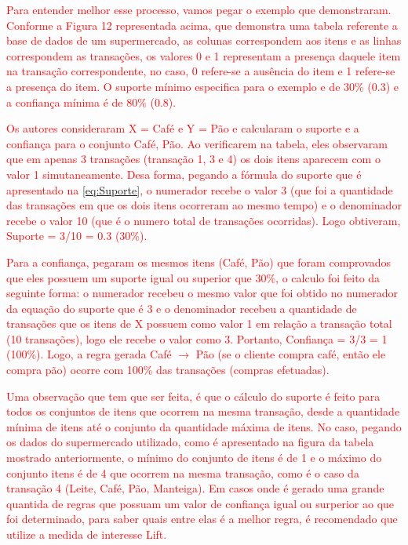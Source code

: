 \par
\textcolor{red}{Para entender melhor esse processo, vamos pegar o exemplo que  demonstraram. Conforme a Figura 12 representada acima, que demonstra uma tabela referente a base de dados de um supermercado, as colunas correspondem aos itens e as linhas correspondem as transações, os valores 0 e 1 representam a presença daquele item na transação correspondente, no caso, 0 refere-se a ausência do item e 1 refere-se a presença do item. O suporte mínimo especifica para o exemplo e de 30\% (0.3) e a confiança mínima é de 80\% (0.8).} 



\textcolor{red}{Os autores  consideraram X = {Café} e Y = {Pão} e calcularam o suporte e a confiança para o conjunto {Café, Pão}. Ao verificarem na tabela, eles observaram que em apenas 3 transações (transação 1, 3 e 4) os dois itens aparecem com o valor 1 simutaneamente. Desa forma, pegando a fórmula do suporte que é apresentado na \autoref{eq:Suporte}, o numerador recebe o valor 3 (que foi a quantidade das transações em que os dois itens ocorreram ao mesmo tempo) e o denominador recebe o valor 10 (que é o numero total de transações ocorridas). Logo obtiveram, Suporte = 3/10 = 0.3 (30\%).}

\par
\textcolor{red}{Para a confiança,  pegaram os mesmos itens (Café, Pão) que foram comprovados que eles possuem um suporte igual ou superior que 30\%, o calculo foi feito da seguinte forma: o numerador recebeu o mesmo valor que foi obtido no numerador da equação do suporte que é 3 e o denominador recebeu a quantidade de transações que os itens de X possuem como valor 1 em relação a transação total (10 transações), logo ele recebe o valor como 3. Portanto, Confiança = 3/3 = 1 (100\%). Logo, a regra gerada Café $\rightarrow$ Pão (se o cliente compra café, então ele compra pão) ocorre com 100\% das transações (compras efetuadas).}

\par
\textcolor{red}{Uma observação que tem que ser feita, é que o cálculo do suporte é feito para todos os conjuntos de itens que ocorrem na mesma transação, desde a quantidade mínima de itens até o conjunto da quantidade máxima de itens. No caso, pegando os dados do supermercado utilizado, como é apresentado na figura da tabela mostrado anteriormente, o mínimo do conjunto de itens é de 1 e o máximo do conjunto itens é de 4 que ocorrem na mesma transação, como é o caso da transação 4 (Leite, Café, Pão, Manteiga). Em casos onde é gerado uma grande quantida de regras que possuam um valor de confiança igual ou surperior ao que foi determinado, para saber quais entre elas é a melhor regra, é recomendado que utilize a medida de interesse Lift.}

